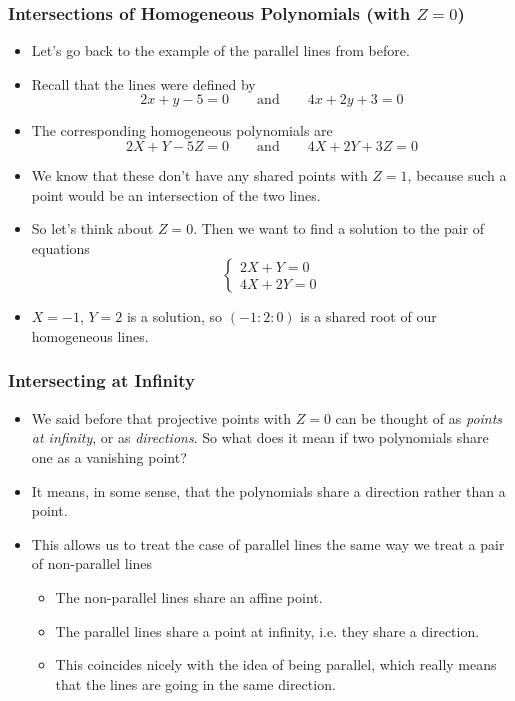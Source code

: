\documentclass[handout]{beamer}
\begin{document}
\begin{frame}
	\frametitle{Intersections of Homogeneous Polynomials (with $Z = 0$)}
	\begin{itemize}
		\item Let's go back to the example of the parallel lines from before.
		
		\item\pause Recall that the lines were defined by
			\[
			2x + y - 5 = 0 \qquad \text{and} \qquad 4x + 2y + 3 = 0
			\]
		
		\item\pause The corresponding homogeneous polynomials are
			\[
			2X + Y - 5Z = 0 \qquad \text{and} \qquad 4X + 2Y + 3Z = 0
			\]
		
		\item\pause We know that these don't have any shared points with $Z = 1$, because such a point would be an intersection of the two lines.
		
		\item\pause So let's think about $Z = 0$. Then we want to find a solution to the pair of equations
			\[
			\begin{cases}
				2X + Y = 0\\
				4X + 2Y = 0
			\end{cases}
			\]
		
		\item\pause $X = -1$, $Y = 2$ is a solution, so $(-1 : 2 : 0)$ is a shared root of our homogeneous lines.
	\end{itemize}
\end{frame}

\begin{frame}
	\frametitle{Intersecting at Infinity}
	\begin{itemize}
		\item We said before that projective points with $Z = 0$ can be thought of as \emph{points at infinity}, or as \emph{directions}. So what does it mean if two polynomials share one as a vanishing point?
		
		\item\pause It means, in some sense, that the polynomials share a direction rather than a point.
		
		\item\pause This allows us to treat the case of parallel lines the same way we treat a pair of non-parallel lines
			\begin{itemize}
				\item\pause The non-parallel lines share an affine point.
				
				\item\pause The parallel lines share a point at infinity, i.e. they share a direction.
				
				\item\pause This coincides nicely with the idea of being parallel, which really means that the lines are going in the same direction.
			\end{itemize}
	\end{itemize}
\end{frame}
\end{document}
